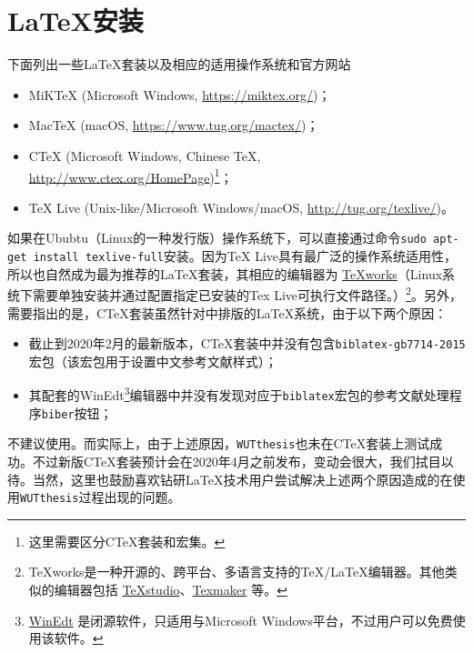 \section{{\LaTeX}安装}

\par 下面列出一些{\LaTeX}套装以及相应的适用操作系统和官方网站
\begin{itemize}
\item MiKTeX (Microsoft Windows, \url{https://miktex.org/})；
\item MacTeX (macOS, \url{https://www.tug.org/mactex/})；
\item CTeX (Microsoft Windows, Chinese TeX, \url{http://www.ctex.org/HomePage})\footnote{这里需要区分CTeX套装和{\CTeX}宏集。}；
\item TeX Live (Unix-like/Microsoft Windows/macOS, \url{http://tug.org/texlive/})。
\end{itemize}
如果在Ububtu（Linux的一种发行版）操作系统下，可以直接通过命令\texttt{sudo apt-get install texlive-full}安装。因为TeX Live具有最广泛的操作系统适用性，所以也自然成为最为推荐的{\LaTeX}套装，其相应的编辑器为 \href{http://www.tug.org/texworks/}{TeXworks}（Linux系统下需要单独安装并通过配置指定已安装的Tex Live可执行文件路径。）\footnote{TeXworks是一种开源的、跨平台、多语言支持的TeX/LaTeX编辑器。其他类似的编辑器包括 \href{https://www.texstudio.org/}{TeXstudio}、\href{https://www.xm1math.net/texmaker/}{Texmaker} 等。}。另外，需要指出的是，CTeX套装虽然针对中排版的{\LaTeX}系统，由于以下两个原因：
\begin{itemize}
\item 截止到2020年2月的最新版本，CTeX套装中并没有包含\texttt{biblatex-gb7714-2015}宏包（该宏包用于设置中文参考文献样式）；
\item 其配套的WinEdt\footnote{\href{http://www.winedt.com/}{WinEdt} 是闭源软件，只适用与Microsoft Windows平台，不过用户可以免费使用该软件。}编辑器中并没有发现对应于\texttt{biblatex}宏包的参考文献处理程序\texttt{biber}按钮；
\end{itemize}
不建议使用。而实际上，由于上述原因，\texttt{WUTthesis}也未在CTeX套装上测试成功。不过新版CTeX套装预计会在2020年4月之前发布，变动会很大，我们拭目以待。当然，这里也鼓励喜欢钻研{\LaTeX}技术用户尝试解决上述两个原因造成的在使用\texttt{WUTthesis}过程出现的问题。











